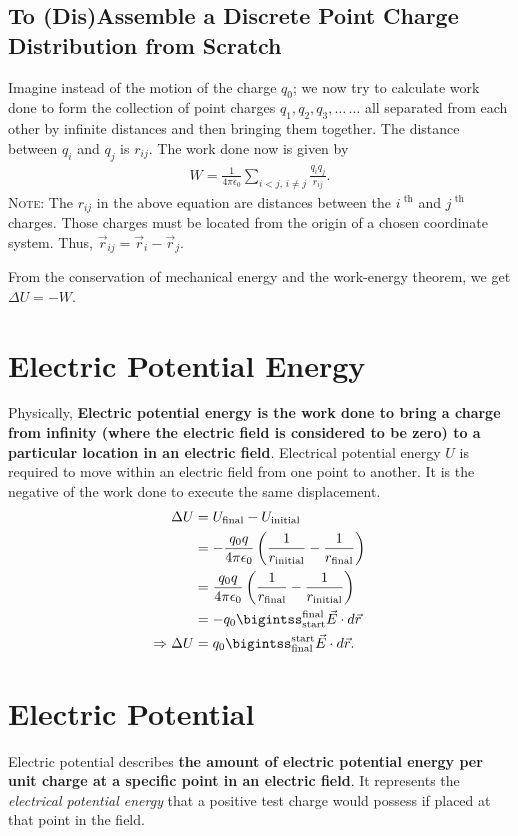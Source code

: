 \documentclass[12pt,b4paper]{article}
\begin{document}
\subsection{To (Dis)Assemble a Discrete Point Charge Distribution from Scratch}
Imagine instead of the motion of the charge $q_0$; we now try to calculate work done to form the collection of point charges $q_1,q_2,q_3,\ldots\,\ldots$ all separated from each other by infinite distances and then bringing them together. The distance between $q_i$ and $q_j$ is $r_{ij}$. The work done now is given by
\begin{align}
    W=\frac{1}{4\pi\epsilon_0}\sum_{i<j,\,i\ne j}\frac{q_iq_j}{r_{ij}}.
\end{align}
\textsc{Note}: The $r_{ij}$ in the above equation are distances between the $i^{\text{ th}}$ and $j^{\text{ th}}$ charges. Those charges must be located from the origin of a chosen coordinate system. Thus, $\vec{r}_{ij}=\vec{r}_i-\vec{r}_j$.

From the conservation of mechanical energy and the work-energy theorem, we get $\Delta U=-W$.
\section{Electric Potential Energy}
Physically, \textbf{Electric potential energy is the work done to bring a charge from infinity (where the electric field is considered to be zero) to a particular location in an electric field}. {Electrical potential energy} $U$ is required to move within an electric field from one point to another. It is the negative of the work done to execute the same displacement.
\begin{align}
    \Delta U&=U_\text{final}-U_\text{initial}\notag\\
    &=-\frac{q_0q}{4\pi\epsilon_0}\left(\frac{1}{r_\text{initial}}-\frac{1}{r_\text{final}}\right)\notag\\
    &=\frac{q_0q}{4\pi\epsilon_0}\left(\frac{1}{r_\text{final}}-\frac{1}{r_\text{initial}}\right)\\
    &=-q_0\bigintss_{\text{start}}^{\text{final}}\vec{E}\cdot d\vec{r}\notag\\
    \Rightarrow\Delta U&=q_0\bigintss_{\text{final}}^{\text{start}}\vec{E}\cdot d\vec{r}.
\end{align}
\section{Electric Potential}
Electric potential describes \textbf{the amount of electric potential energy per unit charge at a specific point in an electric field}. It represents the \textit{electrical potential energy} that a positive test charge would possess if placed at that point in the field.
\end{document}

